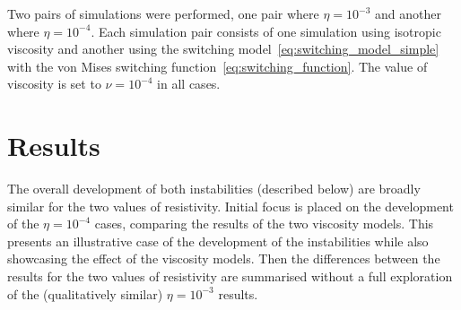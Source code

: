 Two pairs of simulations were performed, one pair where $\eta=10^{-3}$ and another where $\eta=10^{-4}$. Each simulation pair consists of one simulation using isotropic viscosity and another using the switching model~\ref{eq:switching_model_simple} with the von Mises switching function~\ref{eq:switching_function}. The value of viscosity is set to $\nu = 10^{-4}$ in all cases.

\section{Results}

The overall development of both instabilities (described below) are broadly similar for the two values of resistivity. Initial focus is placed on the development of the $\eta=10^{-4}$ cases, comparing the results of the two viscosity models. This presents an illustrative case of the development of the instabilities while also showcasing the effect of the viscosity models. Then the differences between the results for the two values of resistivity are summarised without a full exploration of the (qualitatively similar) $\eta=10^{-3}$ results.

